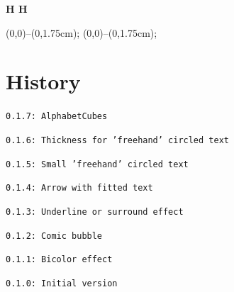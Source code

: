 \documentclass[11pt,a4paper]{ltxdoc}
\begin{document}
\begin{DemoCode}{}
\sffamily\bfseries\Huge%
H%
%
H
\end{DemoCode}

\begin{DemoCode}{}
{\tikz{} (0,0)--(0,1.75cm);}%
%
{\tikz{} (0,0)--(0,1.75cm);}%
\end{DemoCode}

\pagebreak

\section{History}

\texttt{0.1.7: AlphabetCubes}

\texttt{0.1.6: Thickness for 'freehand' circled text}

\texttt{0.1.5: Small 'freehand' circled text}

\texttt{0.1.4: Arrow with fitted text}

\texttt{0.1.3: Underline or surround effect}

\texttt{0.1.2: Comic bubble}

\texttt{0.1.1: Bicolor effect}

\texttt{0.1.0: Initial version}
\end{document}
